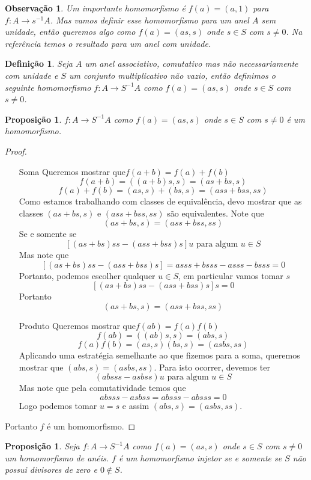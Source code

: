 \documentclass[10pt,a4paper]{article}
\newtheorem{proposition}[theorem]{Proposição}
\newtheorem{remark}[theorem]{Observação}
\newtheorem{definition}[theorem]{Definição}
\begin{document}
\begin{remark}
	Um importante homomorfismo é $f(a)=(a,1)$ para $f:A \rightarrow s^{-1}A$. Mas vamos definir esse homomorfismo para um anel $A$ sem unidade, então queremos algo como $f(a)=(as,s)$ onde $s \in S$ com $s \neq 0$. Na referência \cite{Atiyah} temos o resultado para um anel com unidade.
\end{remark}

\begin{definition}
	Seja $A$ um anel associativo, comutativo mas não necessariamente com unidade e $S$ um conjunto multiplicativo não vazio, então definimos o seguinte homomorfismo $f:A \rightarrow S^{-1}A$ como $f(a)=(as,s)$ onde $s \in S$ com $s \neq 0$.
\end{definition}

\begin{proposition}
	$f:A \rightarrow S^{-1}A$ como $f(a)=(as,s)$ onde $s \in S$ com $s \neq 0$ é um homomorfismo.
\end{proposition}
\begin{proof}
	\begin{enumerate}
		\item[Soma]Queremos mostrar que$f(a+b)=f(a)+f(b)$
		$$f(a+b)=((a+b)s,s)=(as+bs,s)$$
		$$f(a)+f(b)=(as,s)+(bs,s)=(ass+bss,ss)$$
		Como estamos trabalhando com classes de equivalência, devo mostrar que as classes $(as+bs,s)$ e $(ass+bss,ss)$ são equivalentes. Note que 
		$$(as+bs,s)=(ass+bss,ss)$$
		Se e somente se
		$$[(as+bs)ss-(ass+bss)s]u \textrm{ para algum } u \in S$$
		Mas note que 
		$$[(as+bs)ss-(ass+bss)s]=asss+bsss-asss-bsss=0$$
		Portanto, podemos escolher qualquer $u \in S$, em particular vamos tomar $s$
		$$[(as+bs)ss-(ass+bss)s]s=0$$
		Portanto
		$$(as+bs,s)=(ass+bss,ss)$$
		\item[Produto]Queremos mostrar que$f(ab)=f(a)f(b)$
		$$f(ab)=((ab)s,s)=(abs,s)$$
		$$f(a)f(b)=(as,s)(bs,s)=(asbs,ss)$$
		Aplicando uma estratégia semelhante ao que fizemos para a soma, queremos mostrar que $(abs,s)=(asbs,ss)$.
		Para isto ocorrer, devemos ter 
		$$(absss-asbss)u \textrm{ para algum } u \in S$$
		Mas note que pela comutatividade temos que
		$$absss-asbss=absss-absss=0$$
		Logo podemos tomar $u=s$ e assim $(abs,s)=(asbs,ss)$.
	\end{enumerate}

	Portanto $f$ é um homomorfismo.
\end{proof}

\begin{proposition}
	Seja $f:A \rightarrow S^{-1}A$ como $f(a)=(as,s)$ onde $s \in S$ com $s \neq 0$ um homomorfismo de anéis. $f$ é um homomorfismo injetor se e somente se $S$ não possui divisores de zero e $0 \notin S$.
\end{proposition}
\end{document}
